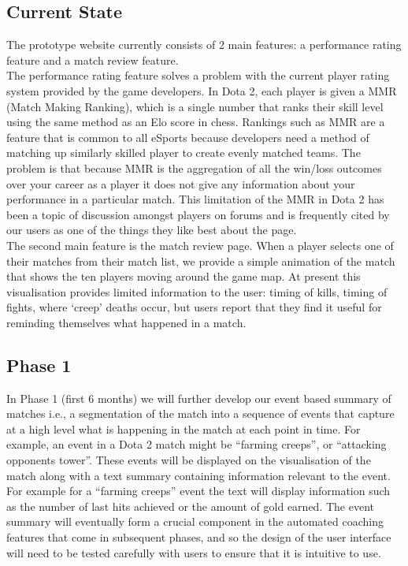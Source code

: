 \documentclass[12pt]{report} %
\begin{document}
\subsection{Current State}

The prototype website currently consists of 2 main features: a performance rating feature and a match review feature.\\ 

The performance rating feature solves a problem with the current player rating system provided by the game developers. In Dota 2, each player is given a MMR (Match Making Ranking), which is a single number that ranks their skill level using the same method as an Elo score in chess. Rankings such as MMR are a feature that is common to all eSports because developers need a method of matching up similarly skilled player to create evenly matched teams. The problem is that because MMR is the aggregation of all the win/loss outcomes over your career as a player it does not give any information about your performance in a particular match. This limitation of the MMR in Dota 2 has been a topic of discussion amongst players on forums and is frequently cited by our users as one of the things they like best about the page.\\

The second main feature is the match review page. When a player selects one of their matches from their match list, we provide a simple animation of the match that shows the ten players moving around the game map. At present this visualisation provides limited information to the user: timing of kills, timing of fights, where `creep' deaths occur, but users report that they find it useful for reminding themselves what happened in a match.

\subsection{Phase 1} 

In Phase 1 (first 6 months) we will further develop our event based summary of matches i.e., a segmentation of the match into a sequence of events that capture at a high level what is happening in the match at each point in time. For example, an event in a Dota 2 match might be ``farming creeps'', or ``attacking opponents tower''. These events will be displayed on the visualisation of the match along with a text summary containing information relevant to the event. For example for a ``farming creeps'' event the text will display information such as the number of last hits achieved or the amount of gold earned. The event summary will eventually form a crucial component in the automated coaching features that come in subsequent phases, and so the design of the user interface will need to be tested carefully with users to ensure that it is intuitive to use.\\
\end{document}
